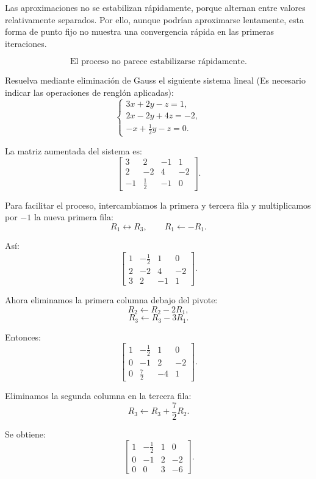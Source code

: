 \documentclass[11pt,respuestas,a4]{aleph-examen}
\begin{document}
\begin{preguntas}
\begin{respuesta}
Las aproximaciones no se estabilizan rápidamente, porque alternan entre valores relativamente separados. Por ello, aunque podrían aproximarse lentamente, esta forma de punto fijo no muestra una convergencia rápida en las primeras iteraciones.

\[
\boxed{\text{El proceso no parece estabilizarse rápidamente.}}
\]
\end{respuesta}



\item
Resuelva mediante eliminación de Gauss el siguiente sistema lineal (Es necesario indicar las operaciones de renglón aplicadas): 
\[
\begin{cases}
3x+2y-z=1,\\
2x-2y+4z=-2,\\
-x+\frac{1}{2}y-z=0.
\end{cases}
\]

\begin{respuesta}
La matriz aumentada del sistema es:
\[
\left[
\begin{array}{ccc|c}
3 & 2 & -1 & 1\\
2 & -2 & 4 & -2\\
-1 & \frac{1}{2} & -1 & 0
\end{array}
\right].
\]

Para facilitar el proceso, intercambiamos la primera y tercera fila y multiplicamos por $-1$ la nueva primera fila:
\[
R_1\leftrightarrow R_3,\qquad R_1\leftarrow -R_1.
\]

Así:
\[
\left[
\begin{array}{ccc|c}
1 & -\frac{1}{2} & 1 & 0\\
2 & -2 & 4 & -2\\
3 & 2 & -1 & 1
\end{array}
\right].
\]

Ahora eliminamos la primera columna debajo del pivote:
\[
R_2\leftarrow R_2-2R_1,
\]
\[
R_3\leftarrow R_3-3R_1.
\]

Entonces:
\[
\left[
\begin{array}{ccc|c}
1 & -\frac{1}{2} & 1 & 0\\
0 & -1 & 2 & -2\\
0 & \frac{7}{2} & -4 & 1
\end{array}
\right].
\]

Eliminamos la segunda columna en la tercera fila:
\[
R_3\leftarrow R_3+\frac{7}{2}R_2.
\]

Se obtiene:
\[
\left[
\begin{array}{ccc|c}
1 & -\frac{1}{2} & 1 & 0\\
0 & -1 & 2 & -2\\
0 & 0 & 3 & -6
\end{array}
\right].
\]


\end{respuesta}
\end{preguntas}
\end{document}
